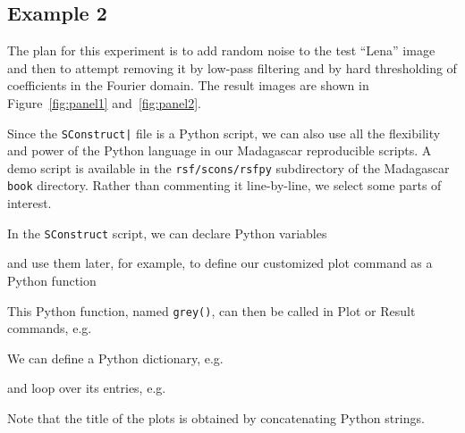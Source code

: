 \subsection{Example 2}

The plan for this experiment is to add random noise to the test
``Lena'' image and then to attempt removing it by low-pass filtering
and by hard thresholding of coefficients in the Fourier domain. The
result images are shown in Figure~\ref{fig:panel1}
and~\ref{fig:panel2}.  



Since the \texttt{SConstruct|} file is a Python script, we can also use all the
flexibility and power of the Python language in our Madagascar
reproducible scripts. A demo script is available in the
\texttt{rsf/scons/rsfpy} subdirectory of the Madagascar \texttt{book}
directory. Rather than commenting it line-by-line, we select some
parts of interest.

In the \texttt{SConstruct} script, we can declare
Python variables



\noindent and use them later, for example, to define our customized plot
command as a Python function



This Python function, named \texttt{grey()}, can then be called in Plot or Result
commands, e.g.



We can define a Python dictionary, e.g.



\noindent and loop over its entries, e.g.



\noindent Note that the title of the plots is obtained by concatenating Python
strings.

